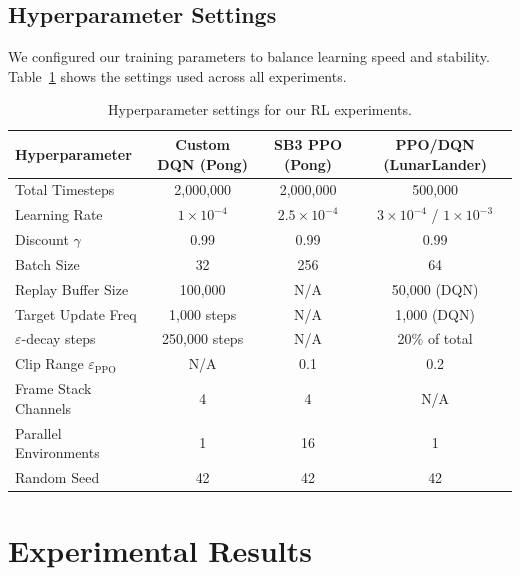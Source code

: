 \documentclass[12pt]{article}
\begin{document}
\subsection{Hyperparameter Settings}
We configured our training parameters to balance learning speed and stability. Table~\ref{tab:hparams} shows the settings used across all experiments.

\begin{table}[h]
  \centering
  \caption{Hyperparameter settings for our RL experiments.}
  \label{tab:hparams}
  \small
  \begin{tabular}{lccc}
    \toprule
    \textbf{Hyperparameter} & \textbf{Custom DQN (Pong)} & \textbf{SB3 PPO (Pong)} & \textbf{PPO/DQN (LunarLander)} \\
    \midrule
    Total Timesteps         & 2,000,000   & 2,000,000   & 500,000          \\
    Learning Rate           & $1\times10^{-4}$ & $2.5\times10^{-4}$ & $3\times10^{-4}$ / $1\times10^{-3}$ \\
    Discount $\gamma$       & 0.99          & 0.99          & 0.99              \\
    Batch Size              & 32            & 256           & 64                \\
    Replay Buffer Size      & 100,000       & N/A           & 50,000 (DQN)      \\
    Target Update Freq      & 1,000 steps   & N/A           & 1,000 (DQN)       \\
    $\varepsilon$-decay steps& 250,000 steps & N/A           & 20\% of total     \\
    Clip Range $\varepsilon_\text{PPO}$ & N/A & 0.1         & 0.2               \\
    Frame Stack Channels    & 4             & 4             & N/A               \\
    Parallel Environments   & 1             & 16            & 1                 \\
    Random Seed             & 42            & 42            & 42                \\
    \bottomrule
  \end{tabular}
\end{table}

\section{Experimental Results}
\label{sec:experiments}
\end{document}
